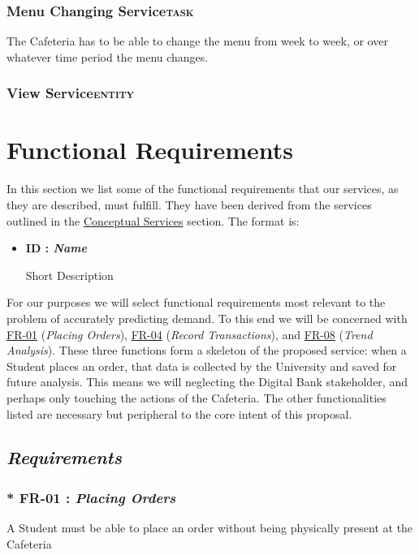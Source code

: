 \documentclass[11pt]{article}
\begin{document}
\subsubsection*{Menu Changing Service\hfill{}\textsc{task}}
\label{sec:org2f29794}
The Cafeteria has to be able to change the menu from week to week,
or over whatever time period the menu changes.

\subsubsection*{View Service\hfill{}\textsc{entity}}
\label{sec:org48bfa93}
\section{Functional Requirements}
\label{sec:org98afa29}

In this section we list some of the functional requirements that our
services, as they are described, must fulfill. They have been
derived from the services outlined in the \hyperref[sec:orgdab1737]{Conceptual Services}
section. The format is:

\begin{itemize}
\item \textbf{ID : \emph{Name}}

Short Description
\end{itemize}

For our purposes we will select functional requirements most
relevant to the problem of accurately predicting demand. To this end
we will be concerned with \hyperref[org97942d8]{FR-01} (\emph{Placing Orders}), \hyperref[org3b9f9e8]{FR-04} (\emph{Record
Transactions}), and \hyperref[org2aeebca]{FR-08} (\emph{Trend Analysis}). These three functions
form a skeleton of the proposed service: when a Student places an
order, that data is collected by the University and saved for future
analysis. This means we will neglecting the Digital Bank
stakeholder, and perhaps only touching the actions of the
Cafeteria. The other functionalities listed are necessary but
peripheral to the core intent of this proposal.

\newpage
\subsection*{\emph{Requirements}}
\label{sec:org6689c70}
\subsubsection*{* \label{org97942d8}FR-01 : \emph{Placing Orders}}
\label{sec:org968a866}
A Student must be able to place an order without being physically
present at the Cafeteria
\end{document}
